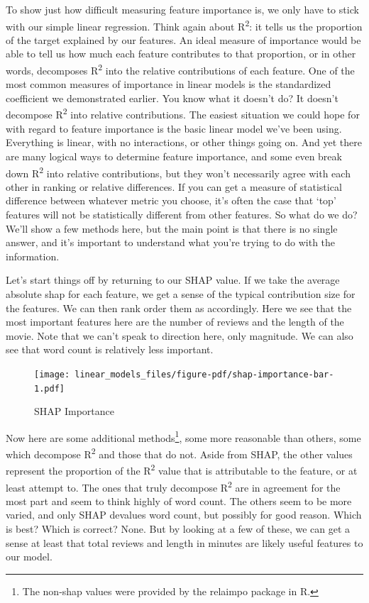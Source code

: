 \documentclass[
  letterpaper,
]{krantz}
\begin{document}
To show just how difficult measuring feature importance is, we only have
to stick with our simple linear regression. Think again about
R\textsuperscript{2}: it tells us the proportion of the target explained
by our features. An ideal measure of importance would be able to tell us
how much each feature contributes to that proportion, or in other words,
decomposes R\textsuperscript{2} into the relative contributions of each
feature. One of the most common measures of importance in linear models
is the standardized coefficient we demonstrated earlier. You know what
it doesn't do? It doesn't decompose R\textsuperscript{2} into relative
contributions. The easiest situation we could hope for with regard to
feature importance is the basic linear model we've been using.
Everything is linear, with no interactions, or other things going on.
And yet there are many logical ways to determine feature importance, and
some even break down R\textsuperscript{2} into relative contributions,
but they won't necessarily agree with each other in ranking or relative
differences. If you can get a measure of statistical difference between
whatever metric you choose, it's often the case that `top' features will
not be statistically different from other features. So what do we do?
We'll show a few methods here, but the main point is that there is no
single answer, and it's important to understand what you're trying to do
with the information.

Let's start things off by returning to our SHAP value. If we take the
average absolute shap for each feature, we get a sense of the typical
contribution size for the features. We can then rank order them as
accordingly. Here we see that the most important features here are the
number of reviews and the length of the movie. Note that we can't speak
to direction here, only magnitude. We can also see that word count is
relatively less important.

\begin{figure}

{\centering \texttt{[image: linear\_models\_files/figure-pdf/shap-importance-bar-1.pdf]}

}

\caption{SHAP Importance}

\end{figure}

Now here are some additional methods\footnote{The non-shap values were
  provided by the {relaimpo} package in R.}, some more reasonable than
others, some which decompose R\textsuperscript{2} and those that do not.
Aside from SHAP, the other values represent the proportion of the
R\textsuperscript{2} value that is attributable to the feature, or at
least attempt to. The ones that truly decompose R\textsuperscript{2} are
in agreement for the most part and seem to think highly of word count.
The others seem to be more varied, and only SHAP devalues word count,
but possibly for good reason. Which is best? Which is correct? None. But
by looking at a few of these, we can get a sense at least that total
reviews and length in minutes are likely useful features to our model.
\end{document}
